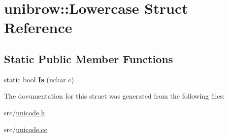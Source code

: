 \hypertarget{structunibrow_1_1_lowercase}{}\section{unibrow\+:\+:Lowercase Struct Reference}
\label{structunibrow_1_1_lowercase}
\subsection*{Static Public Member Functions}
\begin{DoxyCompactItemize}
\item 
\hypertarget{structunibrow_1_1_lowercase_ab275138a1dc36a592549281894ac0f74}{}static bool {\bfseries Is} (uchar c)\label{structunibrow_1_1_lowercase_ab275138a1dc36a592549281894ac0f74}

\end{DoxyCompactItemize}


The documentation for this struct was generated from the following files\+:\begin{DoxyCompactItemize}
\item 
src/\hyperlink{unicode_8h}{unicode.\+h}\item 
src/\hyperlink{unicode_8cc}{unicode.\+cc}\end{DoxyCompactItemize}
